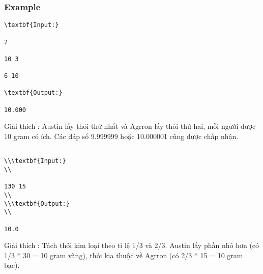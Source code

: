 \subsubsection{   Example  }
\begin{verbatim}
\textbf{Input:}

2

10 3

6 10

\textbf{Output:}

10.000\end{verbatim}

Giải thích        : Austin lấy thỏi thứ nhất và Agrron lấy thỏi thứ hai, mỗi người được 10 gram có ích. Các đáp số 9.999999 hoặc 10.000001 cũng được chấp nhận.
\begin{verbatim}

\\\textbf{Input:}
\\

130 15
\\
\\\textbf{Output:}
\\

10.0\end{verbatim}

Giải thích        : Tách thỏi kim loại theo tỉ lệ 1/3 và 2/3. Austin lấy phần nhỏ hơn (có 1/3 * 30 = 10 gram vàng), thỏi kia thuộc về Agrron (có 2/3 * 15 = 10 gram bạc).
